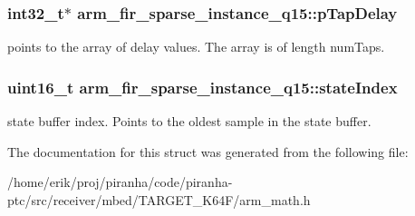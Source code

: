 \subsubsection[{\texorpdfstring{p\+Tap\+Delay}{pTapDelay}}]{\setlength{\rightskip}{0pt plus 5cm}int32\+\_\+t$\ast$ arm\+\_\+fir\+\_\+sparse\+\_\+instance\+\_\+q15\+::p\+Tap\+Delay}\hypertarget{structarm__fir__sparse__instance__q15_aeab2855176c6efdb231a73a3672837d5}{}\label{structarm__fir__sparse__instance__q15_aeab2855176c6efdb231a73a3672837d5}
points to the array of delay values. The array is of length num\+Taps. 
\subsubsection[{\texorpdfstring{state\+Index}{stateIndex}}]{\setlength{\rightskip}{0pt plus 5cm}uint16\+\_\+t arm\+\_\+fir\+\_\+sparse\+\_\+instance\+\_\+q15\+::state\+Index}\hypertarget{structarm__fir__sparse__instance__q15_a89487f28cab52637426024005e478985}{}\label{structarm__fir__sparse__instance__q15_a89487f28cab52637426024005e478985}
state buffer index. Points to the oldest sample in the state buffer. 

The documentation for this struct was generated from the following file\+:\begin{DoxyCompactItemize}
\item 
/home/erik/proj/piranha/code/piranha-\/ptc/src/receiver/mbed/\+T\+A\+R\+G\+E\+T\+\_\+\+K64\+F/arm\+\_\+math.\+h\end{DoxyCompactItemize}
